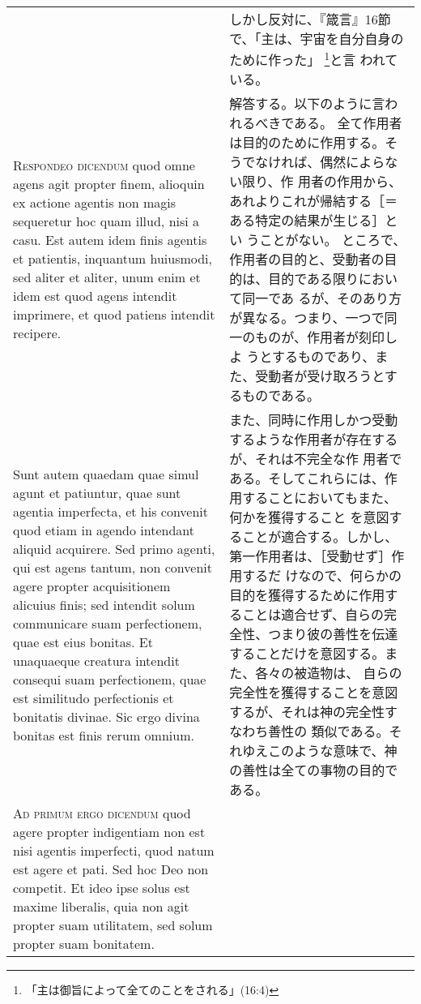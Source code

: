 \documentclass[10pt]{jsarticle} %
\begin{document}
\begin{longtable}{p{21em}p{21em}}
&
しかし反対に、『箴言』16節で、「主は、宇宙を自分自身のために作った」
 \footnote{「主は御旨によって全てのことをされる」(16:4)}と言
 われている。
\\


{\scshape Respondeo dicendum} quod omne agens agit
propter finem, alioquin ex actione agentis non magis sequeretur hoc quam
illud, nisi a casu. Est autem idem finis agentis et patientis, inquantum
huiusmodi, sed aliter et aliter, unum enim et idem est quod agens
intendit imprimere, et quod patiens intendit recipere. 

&

解答する。以下のように言われるべきである。
全て作用者は目的のために作用する。そうでなければ、偶然によらない限り、作
 用者の作用から、あれよりこれが帰結する［＝ある特定の結果が生じる］とい
 うことがない。
ところで、作用者の目的と、受動者の目的は、目的である限りにおいて同一であ
 るが、そのあり方が異なる。つまり、一つで同一のものが、作用者が刻印しよ
 うとするものであり、また、受動者が受け取ろうとするものである。

\\

Sunt autem
quaedam quae simul agunt et patiuntur, quae sunt agentia imperfecta, et
his convenit quod etiam in agendo intendant aliquid acquirere. Sed primo
agenti, qui est agens tantum, non convenit agere propter acquisitionem
alicuius finis; sed intendit solum communicare suam perfectionem, quae
est eius bonitas. Et unaquaeque creatura intendit consequi suam
perfectionem, quae est similitudo perfectionis et bonitatis divinae. Sic
ergo divina bonitas est finis rerum omnium.


&


また、同時に作用しかつ受動するような作用者が存在するが、それは不完全な作
用者である。そしてこれらには、作用することにおいてもまた、何かを獲得すること
 を意図することが適合する。しかし、第一作用者は、［受動せず］作用するだ
 けなので、何らかの目的を獲得するために作用することは適合せず、自らの完
 全性、つまり彼の善性を伝達することだけを意図する。また、各々の被造物は、
 自らの完全性を獲得することを意図するが、それは神の完全性すなわち善性の
 類似である。それゆえこのような意味で、神の善性は全ての事物の目的である。

\\


{\scshape Ad primum ergo dicendum} quod agere propter
indigentiam non est nisi agentis imperfecti, quod natum est agere et
pati. Sed hoc Deo non competit. Et ideo ipse solus est maxime liberalis,
quia non agit propter suam utilitatem, sed solum propter suam bonitatem.


\end{longtable}
\end{document}

